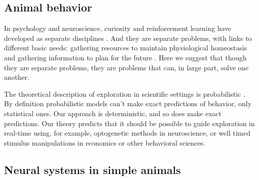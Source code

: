 \documentclass[9pt,lineno]{elife}
\begin{document}
\subsection*{Animal behavior}
In psychology and neuroscience, curiosity and reinforcement learning have developed as separate disciplines \citep{Berlyne1950,Kidd2015,Sutton2018}. And they are separate problems, with links to different basic needs: gathering resources to maintain physiological homeostasis \citep{Keramati2014,Juechems2019} and gathering information to plan for the future \citep{Valiant1984,Sutton2018}. Here we suggest that though they are separate problems, they are problems that can, in large part, solve one another.

The theoretical description of exploration in scientific settings is probabilistic \citep{Calhoun2014,Song2019a,Gershman2018b,Schulz2018a}. By definition probabilistic models can't make exact predictions of behavior, only statistical ones. Our approach is deterministic, and so does make exact predictions. Our theory predicts that it should be possible to guide exploration in real-time using, for example, optogenetic methods in neuroscience, or well timed stimulus manipulations in economics or other behavioral sciences. 

\subsection*{Neural systems in simple animals}


\end{document}
